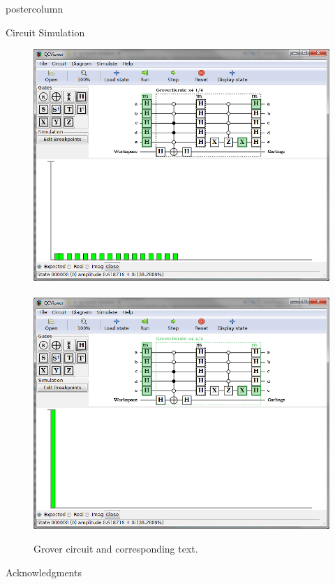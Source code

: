 \documentclass[final]{beamer} %
\begin{document}
\begin{frame}{}
\begin{columns}
\begin{column}{.33\textwidth}
\begin{beamercolorbox}[center,wd=\textwidth]{postercolumn}
\begin{minipage}[c][0.95\textheight][s]{0.95\columnwidth}
\begin{block}{\large Circuit Simulation}
\begin{figure}[!htbp]
		            \includegraphics[width=7in]{figures/Grover_Simulate1.png} \ \  \includegraphics[width=7in]{figures/Grover_Simulate2.png}
		            \caption{Grover circuit and corresponding text.}
		        \end{figure}
            \end{block}
            \vfill
            \begin{block}{\large Acknowledgments}
                \begin{center}

\end{center}
\end{block}
\end{minipage}
\end{beamercolorbox}
\end{column}
\end{columns}
\end{frame}
\end{document}
